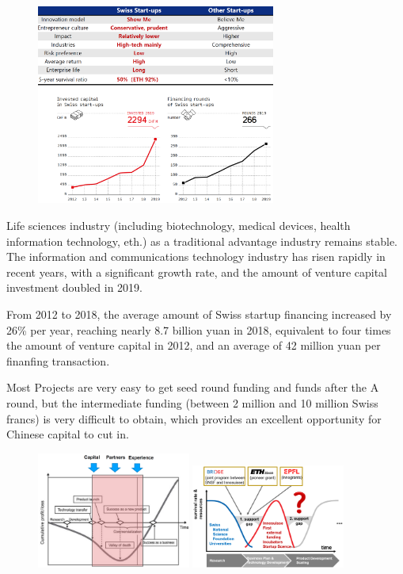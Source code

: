 \begin{figure}[h]
    \centering
    \includegraphics[width=0.7\textwidth]{Pictures/swiss_starups.png}
\end{figure}

Life sciences industry (including biotechnology, medical devices, health
information technology, eth.) as a traditional advantage industry remains
stable. The information and communications technology industry has risen
rapidly in recent years, with a significant growth rate, and the amount
of venture capital investment doubled in 2019.

\vspace{1\baselineskip}

From 2012 to 2018, the average amount of Swiss startup financing increased
by 26\% per year, reaching nearly 8.7 billion yuan in 2018, equivalent to
four times the amount of venture capital in 2012, and an average of 42 million
yuan per finanfing transaction.

Most Projects are very easy to get seed round funding and funds after the
A round, but the intermediate funding (between 2 million and 10 million
Swiss francs) is very difficult to obtain, which provides an excellent
opportunity for Chinese capital to cut in.

\begin{figure}[H]
    \centering
    \includegraphics[width=0.45\textwidth]{Pictures/startup_lifecycle.png}
    \hspace{10pt}
    \includegraphics[width=0.45\textwidth]{Pictures/startup_lifecycle_2.png}
\end{figure}

